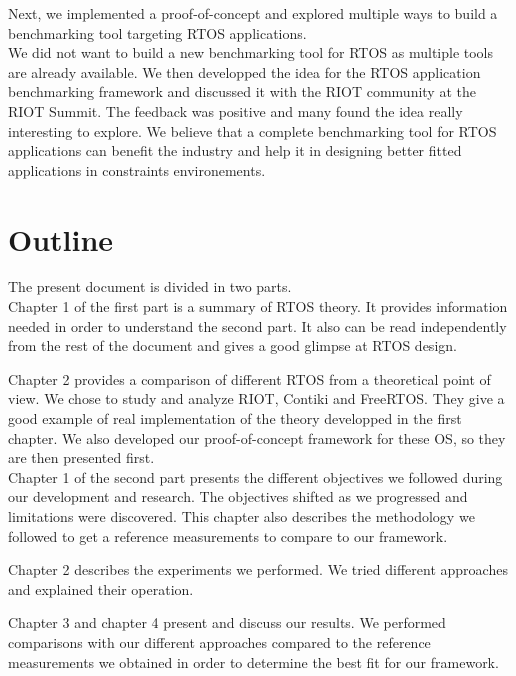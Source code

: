 Next, we implemented a proof-of-concept and explored multiple ways to build a benchmarking tool targeting RTOS applications.\\

We did not want to build a new benchmarking tool for RTOS as multiple tools are already available.
We then developped the idea for the RTOS application benchmarking framework and discussed it with the RIOT community at the RIOT Summit.
The feedback was positive and many found the idea really interesting to explore.
We believe that a complete benchmarking tool for RTOS applications can benefit the industry 
    and help it in designing better fitted applications in constraints environements.
%
%
\section*{Outline}
The present document is divided in two parts.\\

Chapter 1 of the first part is a summary of RTOS theory.
It provides information needed in order to understand the second part.
It also can be read independently from the rest of the document and gives a good glimpse at RTOS design.

Chapter 2 provides a comparison of different RTOS from a theoretical point of view.
We chose to study and analyze RIOT, Contiki and FreeRTOS.
They give a good example of real implementation of the theory developped in the first chapter.
We also developed our proof-of-concept framework for these OS, so they are then presented first.\\

Chapter 1 of the second part presents the different objectives we followed during our development and research.
The objectives shifted as we progressed and limitations were discovered.
This chapter also describes the methodology we followed to get a reference measurements to compare to our framework.

Chapter 2 describes the experiments we performed.
We tried different approaches and explained their operation.

Chapter 3 and chapter 4 present and discuss our results.
We performed comparisons with our different approaches compared to the reference measurements we obtained in order to determine the best fit for our framework.